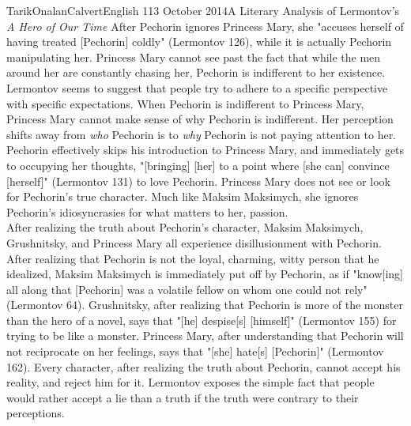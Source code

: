\documentclass[12pt,a4paper]{article}
\begin{document}
\begin{mla}{Tarik}{Onalan}{Calvert}{English 1}{13 October 2014}{A Literary Analysis of Lermontov's \textit{A Hero of Our Time}}
        After Pechorin ignores Princess Mary, she "accuses herself of having treated
        [Pechorin] coldly" (Lermontov 126), while it is actually Pechorin manipulating
        her. Princess Mary cannot see past the fact that while the men around her are
        constantly chasing her, Pechorin is indifferent to her existence. Lermontov
        seems to suggest that people try to adhere to a specific perspective with specific
        expectations. When Pechorin is indifferent to Princess Mary, Princess Mary
        cannot make sense of why Pechorin is indifferent. Her perception shifts away
        from \textit{who} Pechorin is to \textit{why} Pechorin is not paying attention
        to her. Pechorin effectively skips his introduction to Princess Mary, and immediately
        gets to occupying her thoughts, "[bringing] [her] to a point where [she can]
        convince [herself]" (Lermontov 131) to love Pechorin. Princess Mary does not
        see or look for Pechorin's true character. Much like Maksim Maksimych, she
        ignores Pechorin's idiosyncrasies for what matters to her, passion.\\

        After realizing the truth about Pechorin's character, Maksim Maksimych, Grushnitsky,
        and Princess Mary all experience disillusionment with Pechorin. After realizing
        that Pechorin is not the loyal, charming, witty person that he idealized, Maksim
        Maksimych is immediately put off by Pechorin, as if "know[ing] all along that
        [Pechorin] was a volatile fellow on whom one could not rely" (Lermontov 64).
        Grushnitsky, after realizing that Pechorin is more of the monster than the
        hero of a novel, says that "[he] despise[s] [himself]" (Lermontov 155) for trying to
        be like a monster. Princess Mary, after understanding that Pechorin will not reciprocate
        on her feelings, says that "[she] hate[s] [Pechorin]" (Lermontov 162). Every character,
        after realizing the truth about Pechorin, cannot accept his reality, and reject
        him for it. Lermontov exposes the simple fact that people would rather accept
        a lie than a truth if the truth were contrary to their perceptions.
    \end{mla}
\end{document}
